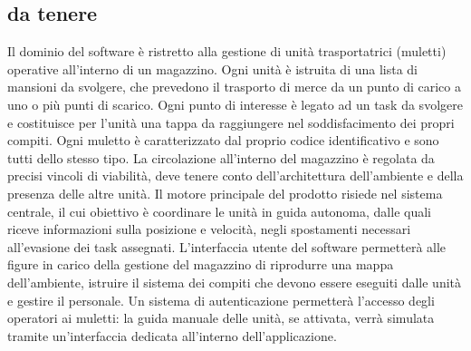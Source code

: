 \subsection{da tenere}
Il dominio del software è ristretto alla gestione di unità trasportatrici (muletti) operative all’interno di un magazzino. Ogni unità è istruita di una lista di mansioni da svolgere, che prevedono il trasporto di merce da un punto di carico a uno o più punti di scarico. Ogni punto di interesse è legato ad un task da svolgere e costituisce per l’unità una tappa da raggiungere nel soddisfacimento dei propri compiti. Ogni muletto è caratterizzato dal proprio codice identificativo e sono tutti dello stesso tipo.
La circolazione all’interno del magazzino è regolata da precisi vincoli di viabilità, deve tenere conto dell’architettura dell’ambiente e della presenza delle altre unità. 
Il motore principale del prodotto risiede nel sistema centrale, il cui obiettivo è coordinare le unità in guida autonoma, dalle quali riceve informazioni sulla posizione e velocità, negli spostamenti necessari all’evasione dei task assegnati. L’interfaccia utente del software permetterà alle figure in carico della gestione del magazzino di riprodurre una mappa dell’ambiente, istruire il sistema dei compiti che devono essere eseguiti dalle unità e gestire il personale. Un sistema di autenticazione permetterà l’accesso degli operatori ai muletti: la guida manuale delle unità, se attivata, verrà simulata tramite un’interfaccia dedicata all’interno dell’applicazione.

